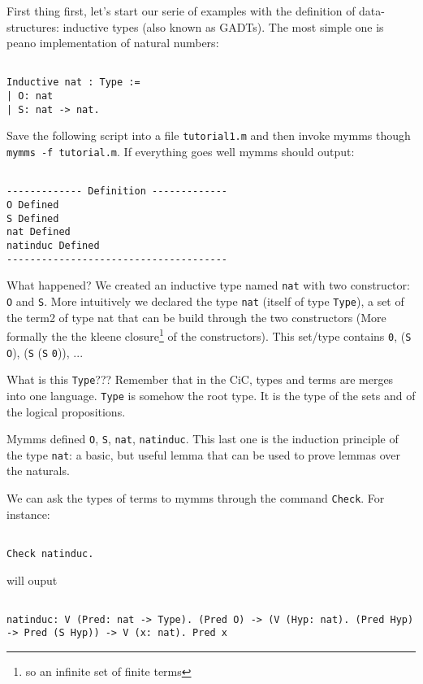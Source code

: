 \documentclass[a4paper,5pt,onecolumn]{article}
\begin{document}
First thing first, let's start our serie of examples with the
definition of data-structures: inductive types (also known as GADTs).
The most simple one is peano implementation of natural numbers:

\begin{verbatim}

Inductive nat : Type :=
| O: nat
| S: nat -> nat.

\end{verbatim}

Save the following script into a file \texttt{tutorial1.m} and then
invoke mymms though \texttt{mymms -f tutorial.m}. If everything goes
well mymms should output:

\begin{verbatim}

------------- Definition -------------
O Defined
S Defined
nat Defined
natinduc Defined
--------------------------------------

\end{verbatim}

What happened? We created an inductive type named \texttt{nat} with
two constructor: \texttt{O} and \texttt{S}. More intuitively we
declared the type \texttt{nat} (itself of type \texttt{Type}), a set
of the term2 of type nat that can be build through the two
constructors (More formally the the kleene closure\footnote{so an
  infinite set of finite terms} of the constructors). This set/type
contains \texttt{0}, (\texttt{S} \texttt{O}), (\texttt{S} (\texttt{S}
\texttt{0})), ...

What is this \texttt{Type}??? Remember that in the CiC, types and
terms are merges into one language. \texttt{Type} is somehow the root
type. It is the type of the sets and of the logical propositions.

Mymms defined \texttt{O}, \texttt{S}, \texttt{nat},
\texttt{natinduc}. This last one is the induction principle of the
type \texttt{nat}: a basic, but useful lemma that can be used to prove
lemmas over the naturals.

We can ask the types of terms to mymms through the command
\texttt{Check}. For instance:

\begin{verbatim}

Check natinduc.

\end{verbatim}

will ouput

\begin{verbatim}

natinduc: V (Pred: nat -> Type). (Pred O) -> (V (Hyp: nat). (Pred Hyp) -> Pred (S Hyp)) -> V (x: nat). Pred x

\end{verbatim}
\end{document}

